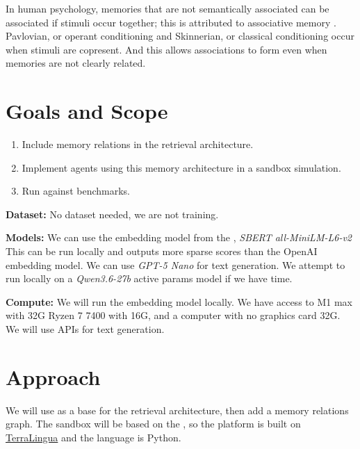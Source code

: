 \documentclass{article}
\begin{document}
In human psychology, memories that are not semantically associated can be associated if stimuli occur together; this is attributed to associative memory \parencite{looti2026associativememory}.
Pavlovian, or operant conditioning and Skinnerian, or classical conditioning occur when stimuli are copresent.
And this allows associations to form even when memories are not clearly related.

\section{Goals and Scope}
\begin{enumerate}
    \item Include memory relations in the retrieval architecture.
    \item Implement agents using this memory architecture in a sandbox simulation.
    \item Run against benchmarks.
\end{enumerate}
\textbf{Dataset:} No dataset needed, we are not training.

\textbf{Models:} We can use the embedding model from the \textcite{honda2026actr}, \textit{SBERT all-MiniLM-L6-v2}
This can be run locally and outputs more sparse scores than the OpenAI embedding model.
We can use \textit{GPT-5 Nano} for text generation.
We attempt to run locally on a \textit{Qwen3.6-27b} active params model if we have time.

\textbf{Compute:} We will run the embedding model locally.
We have access to M1 max  with 32G Ryzen 7 7400 with 16G, and a computer with no graphics card 32G.
We will use APIs for text generation.

\section{Approach}
We will use \textcite{honda2026actr} as a base for the retrieval architecture, then add a memory relations graph.
The sandbox will be based on the \textcite{paolo2026terralinguaemergenceanalysisopenendedness},
so the platform is built on \href{https://github.com/cognizant-ai-lab/terralingua}{TerraLingua} and the language is Python.
\end{document}
